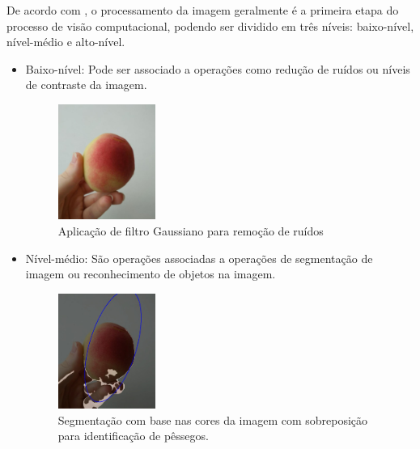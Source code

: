De acordo com , o processamento da imagem geralmente é a primeira etapa do processo de visão computacional, podendo ser dividido em três níveis: baixo-nível, nível-médio e alto-nível.
\begin{itemize}
\item Baixo-nível: 
	Pode ser associado a operações como redução de ruídos ou níveis de contraste da imagem. 
   \begin{figure}[h]
	\caption{\label{fig:blur}Aplicação de filtro Gaussiano para remoção de ruídos}
	\begin{center}
	    \includegraphics[width=0.3\textwidth]{peachs/blur}
	\end{center}
\end{figure} 
\item Nível-médio:
	São operações associadas a operações de segmentação de imagem ou reconhecimento de objetos na imagem.   
       \begin{figure}[H]
	\caption{\label{fig:segment}Segmentação com base nas cores da imagem com sobreposição para identificação de pêssegos.}
	\begin{center}
	    \includegraphics[width=0.3\textwidth]{peachs/identified}
	\end{center}
\end{figure}


\end{itemize}
